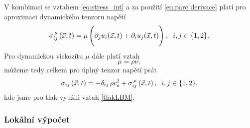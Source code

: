 
 V kombinaci se vztahem \eqref{eq:stress_int} a za použití \eqref{eq:parc derivace} platí pro aproximaci dynamického tenzoru napětí
\begin{equation}\label{eq:front difference}
	\sigma^{\, \mu}_{ij} \, (\vec{x}, t) = \mu \, \Bigg( 
	\partial_{j} u_{i}(\vec{x}, t) + \partial_{i} u_{j}(\vec{x}, t)
	\Bigg) \: , \hspace{2mm} i,j \in \{1,2\}.
\end{equation}
Pro dynamickou viskozitu $ \mu $ dále platí vztah
\begin{equation}\label{eq:mu}
\mu = \rho \nu,
\end{equation}
můžeme tedy celkem pro úplný tenzor napětí psát
\begin{equation}\label{eq:total stress tensor}
\sigma_{ij} \, (\vec{x}, t) = - \delta_{ij} \, \rho c^{2}_{s} + \sigma^{\, \mu}_{ij} \, (\vec{x}, t) \,, \hspace{2mm} i,j \in \{1,2\},
\end{equation}
kde jsme pro tlak využili vztah \eqref{tlakLBM}.
\subsubsection{\fontsize{11}{15}\selectfont Lokální výpočet}\label{lokalni vypocet}
